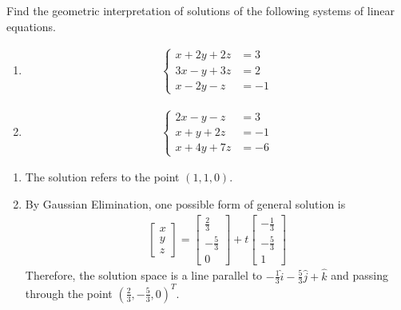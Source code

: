 \begin{Exercise}
Find the geometric interpretation of solutions of the following systems of linear equations.
\begin{enumerate}[label=(\alph*)]
\item \begin{align*}
\begin{cases}
x + 2y + 2z &= 3\\
3x - y + 3z &= 2\\
x - 2y - z &= -1
\end{cases}
\end{align*}
\item
\begin{align*}
\begin{cases}
2x - y - z &= 3\\
x + y + 2z &= -1\\
x + 4y + 7z &= -6
\end{cases}
\end{align*}
\end{enumerate}
\end{Exercise}
\begin{Answer}
\begin{enumerate}[label=(\alph*)]
\item The solution refers to the point $(1,1,0)$.
\item By Gaussian Elimination, one possible form of general solution is 
\begin{align*}
\begin{bmatrix}
x\\
y\\
z
\end{bmatrix}
=
\begin{bmatrix}
\frac{2}{3}\\
-\frac{5}{3}\\
0
\end{bmatrix}
+
t
\begin{bmatrix}
-\frac{1}{3}\\
-\frac{5}{3}\\
1
\end{bmatrix}    
\end{align*} 
Therefore, the solution space is a line parallel to 
$-\frac{1}{3}\hat{i} - \frac{5}{3}\hat{j} + \hat{k}$ and passing through the point $(\frac{2}{3}, -\frac{5}{3}, 0)^T$.
\end{enumerate}
\end{Answer}